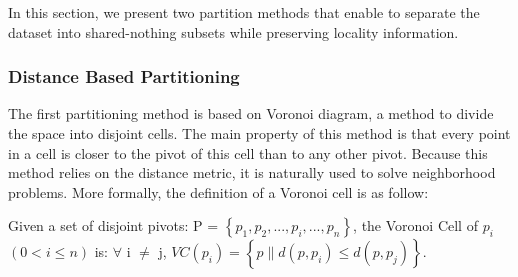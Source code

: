 In this section, we present two partition methods that enable to separate the 
dataset into shared-nothing subsets while preserving locality information.
 


\subsubsection{Distance Based Partitioning}
The first partitioning method is based on Voronoi diagram, a method to divide the space into disjoint cells. The main property of this method 
is that every point in a cell is
closer to the pivot of this cell than to any other pivot. Because this method relies on the distance metric, it is naturally used to solve neighborhood problems. More formally, the 
definition of a Voronoi cell is as follow:
\begin{myDef}
Given a set of disjoint pivots: P = $\left\{ p_1, p_2, ..., p_i, ..., p_n \right\}$, the Voronoi Cell of $p_i$ $\left(0 < 
i \leq n \right)$ is: $
\forall$ i $\neq$ j, $VC\left(p_i\right) = \left\{p \| d\left(p, p_i\right) \leq d\left(p, p_j\right) \right\}$. 
\end{myDef}

